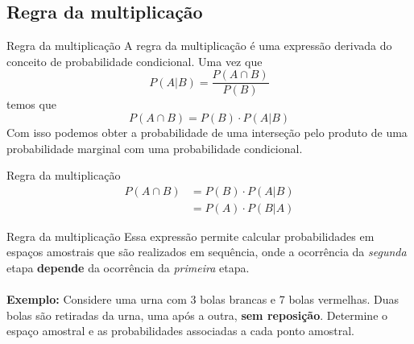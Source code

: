 \documentclass[10pt]{beamer}\usepackage[]{graphicx}\usepackage[]{color}
\theoremstyle{definition}
\begin{document}
\subsection{Regra da multiplicação}

\begin{frame}[fragile]{Regra da multiplicação}
  A regra da multiplicação é uma expressão derivada do conceito de
  probabilidade condicional. Uma vez que
  \begin{equation*}
    P(A|B) = \frac{P(A\cap B)}{P(B)}
  \end{equation*}
  temos que
  \begin{equation*}
    P(A\cap B) = P(B) \cdot P(A|B)
  \end{equation*}
  Com isso podemos obter a probabilidade de uma interseção pelo produto
  de uma probabilidade marginal com uma probabilidade condicional.
  \begin{block}{Regra da multiplicação}
    \begin{align*}
      P(A\cap B) &= P(B) \cdot P(A|B) \\
      &= P(A) \cdot P(B|A)
    \end{align*}
  \end{block}
\end{frame}

\begin{frame}[fragile]{Regra da multiplicação} %
  Essa expressão permite calcular probabilidades em espaços amostrais
  que são realizados em sequência, onde a ocorrência da \textsl{segunda}
  etapa \textbf{depende} da ocorrência da \textsl{primeira} etapa. \\~\\
  \textbf{Exemplo:} Considere uma urna com 3 bolas brancas e 7 bolas
  vermelhas. Duas bolas são retiradas da urna, uma após a outra,
  \textbf{sem reposição}. Determine o espaço amostral e as
  probabilidades associadas a cada ponto amostral.
\end{frame}
\end{document}

